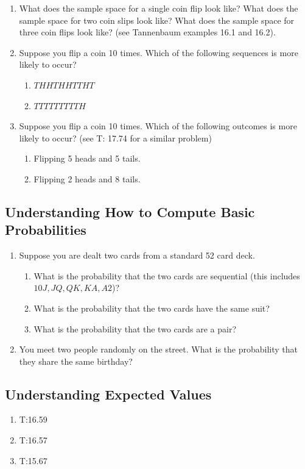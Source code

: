 \documentclass[11pt, letterpaper]{article}
\begin{document}
\begin{enumerate}
	\item What does the sample space for a single coin flip look like?
	What does the sample space for two coin slips look like?
	What does the sample space for three coin flips look like?  (see Tannenbaum examples 16.1 and 16.2).
	\item Suppose you flip a coin 10 times. Which of the following sequences is more likely to occur?
	\begin{enumerate}
		\item $THHTHHTTHT$
		\item $TTTTTTTTTH$
	\end{enumerate}
	\item Suppose you flip a coin 10 times. Which of the following outcomes is more likely to occur? (see T: 17.74 for a similar problem)
	\begin{enumerate}
		\item Flipping 5 heads and 5 tails.
		\item Flipping 2 heads and 8 tails.
	\end{enumerate}
\end{enumerate}
\subsection{Understanding How to Compute Basic Probabilities}
\begin{enumerate}
	\item Suppose you are dealt two cards from a standard 52 card deck. 
	\begin{enumerate}
		\item What is the probability that the two cards are sequential (this includes $10J, JQ,QK,KA,A2$)?
		\item What is the probability that the two cards have the same suit?
		\item What is the probability that the two cards are a pair?
	\end{enumerate}
	\item You meet two people randomly on the street. What is the probability that they share the same birthday?
\end{enumerate}
	
\subsection{Understanding Expected Values}
\begin{enumerate}
	\item T:16.59
	\item T:16.57
	\item T:15.67
\end{enumerate}
\end{document}

